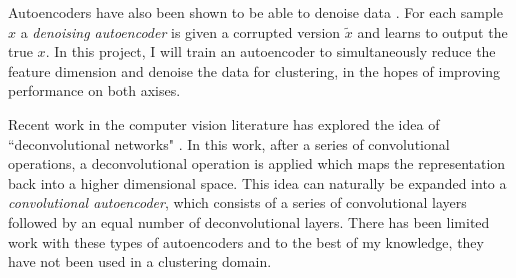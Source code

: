 \documentclass[10pt,twocolumn]{article}
\begin{document}
Autoencoders have also been shown to be able to denoise data \cite{noiseae}. For each sample $x$ a  \textit{denoising autoencoder}  is given a corrupted version $\tilde{x}$ and learns to output the true $x$. In this project, I will train an autoencoder to simultaneously reduce the feature dimension and denoise the data for clustering, in the hopes of improving performance on both axises.

Recent work in the computer vision literature has explored the idea of ``deconvolutional networks" \cite{chairs}\cite{gan}\cite{decon}. In this work, after a series of convolutional operations, a deconvolutional operation is applied which maps the representation back into a higher dimensional space. This idea can naturally be expanded into a \textit{convolutional autoencoder}, which consists of a series of convolutional layers followed by an equal number of deconvolutional layers. There has been limited work with these types of autoencoders and to the best of my knowledge, they have not been used in a clustering domain.
\end{document}
